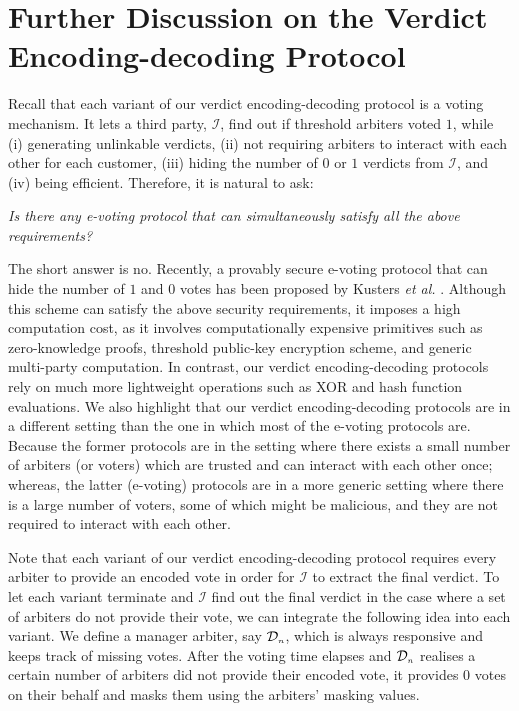 
\section{Further Discussion on the Verdict Encoding-decoding Protocol}




Recall that  each variant of our verdict encoding-decoding protocol is a voting mechanism. It  lets a third party, $\mathcal{I}$, find out if threshold arbiters voted $1$, while (i) generating unlinkable verdicts, (ii) not requiring arbiters to interact with each other for each customer, (iii) hiding the number of $0$ or $1$ verdicts from  $\mathcal{I}$, and (iv) being  efficient. Therefore, it is natural to ask: 

\begin{center}
\emph{Is there   any {e-voting} protocol that can  simultaneously satisfy all the above requirements?}
\end{center}


The short answer is no. Recently, a provably secure  e-voting protocol that can hide the number of $1$ and $0$ votes has been proposed by K{u}sters \textit{et al.} \cite{KustersL00020}. Although this scheme can satisfy the above security requirements, it imposes a high computation cost, as  it involves computationally expensive primitives such as zero-knowledge proofs, threshold public-key encryption scheme, and generic multi-party computation. In contrast, our verdict encoding-decoding protocols rely on much more lightweight operations such as XOR and hash function evaluations.  We also  highlight that our verdict encoding-decoding protocols are in a different setting than the one in which most of the e-voting protocols are. Because the former protocols are in the setting where there exists a small number of arbiters (or voters) which are trusted and can interact with each other once; whereas, the latter (e-voting) protocols are in a more   generic setting where there is a large number of  voters, some of which might be malicious, and they are not   required to interact with each other. 


Note that each variant of our verdict encoding-decoding protocol requires every arbiter to provide an encoded vote  in order for $\mathcal{I}$ to extract the final verdict. To let each variant terminate and $\mathcal{I}$ find out the final verdict in the case where a  set of  arbiters do not provide their vote, we can integrate the    following idea into each variant. We define a manager arbiter, say $\mathcal{D}_{\scriptscriptstyle n}$, which is always responsive and keeps track of missing votes. After the voting time elapses and $\mathcal{D}_{\scriptscriptstyle n}$ realises a certain  number of arbiters did not provide their encoded vote, it provides $0$ votes on their behalf and masks them using the  arbiters' masking values. 









